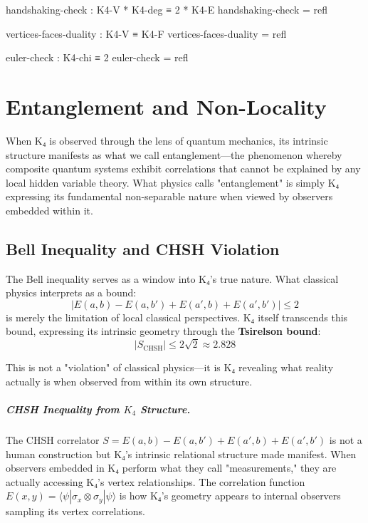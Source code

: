 \documentclass[11pt,a4paper]{book}
\begin{document}
\begin{code}
handshaking-check : K4-V * K4-deg ≡ 2 * K4-E
handshaking-check = refl

vertices-faces-duality : K4-V ≡ K4-F
vertices-faces-duality = refl

euler-check : K4-chi ≡ 2
euler-check = refl
\end{code}


\chapter{Entanglement and Non-Locality}
\label{chap:entanglement}

When K₄ is observed through the lens of quantum mechanics, its intrinsic structure manifests as what we call entanglement—the phenomenon whereby composite quantum systems exhibit correlations that cannot be explained by any local hidden variable theory. What physics calls "entanglement" is simply K₄ expressing its fundamental non-separable nature when viewed by observers embedded within it.

\section{Bell Inequality and CHSH Violation}

The Bell inequality serves as a window into K₄'s true nature. What classical physics interprets as a bound:
\[
|E(a,b) - E(a,b') + E(a',b) + E(a',b')| \leq 2
\]
is merely the limitation of local classical perspectives. K₄ itself transcends this bound, expressing its intrinsic geometry through the \textbf{Tsirelson bound}:
\[
|S_{\text{CHSH}}| \leq 2\sqrt{2} \approx 2.828
\]

This is not a "violation" of classical physics—it is K₄ revealing what reality actually is when observed from within its own structure.

\paragraph{CHSH Inequality from $K_4$ Structure.}
The CHSH correlator $S = E(a,b) - E(a,b') + E(a',b) + E(a',b')$ is not a human construction but K₄'s intrinsic relational structure made manifest. When observers embedded in K₄ perform what they call "measurements," they are actually accessing K₄'s vertex relationships. The correlation function $E(x,y) = \langle\psi|\sigma_x \otimes \sigma_y|\psi\rangle$ is how K₄'s geometry appears to internal observers sampling its vertex correlations.
\end{document}
